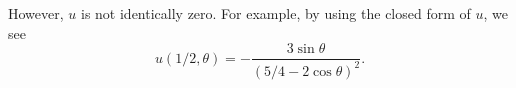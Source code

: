 \begin{exrc}[18]
\begin{soln}
    However, \(u\) is not identically zero.
    For example, by using the closed form of \(u\), we see
    \begin{equation*}
        u(1 / 2, \theta) = -\frac{3 \sin \theta}{(5 / 4 - 2 \cos \theta)^2}.
    \end{equation*}

\end{soln}
\end{exrc}
